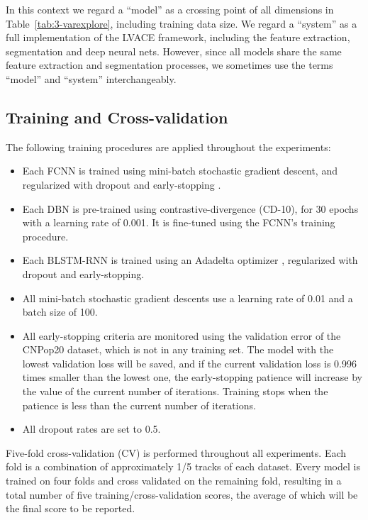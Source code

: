 In this context we regard a ``model'' as a crossing point of all dimensions in Table~\ref{tab:3-varexplore}, including training data size. We regard a ``system'' as a full implementation of the LVACE framework, including the feature extraction, segmentation and deep neural nets. However, since all models share the same feature extraction and segmentation processes, we sometimes use the terms ``model'' and ``system'' interchangeably.


\subsection{Training and Cross-validation}\label{sec:3-traintest}

The following training procedures are applied throughout the experiments: 
\begin{itemize}
	\item Each FCNN is trained using mini-batch stochastic gradient descent, and regularized with dropout \cite{srivastava2014dropout} and early-stopping \cite{prechelt1998automatic}. 
	\item Each DBN is pre-trained using contrastive-divergence \cite{hinton2006fast} (CD-10), for 30 epochs with a learning rate of 0.001. It is fine-tuned using the FCNN's training procedure.
	\item Each BLSTM-RNN is trained using an Adadelta optimizer \cite{zeiler2012adadelta}, regularized with dropout and early-stopping. 
	\item All mini-batch stochastic gradient descents use a learning rate of 0.01 and a batch size of 100. 
	\item All early-stopping criteria are monitored using the validation error of the CNPop20 dataset, which is not in any training set. The model with the lowest validation loss will be saved, and if the current validation loss is 0.996 times smaller than the lowest one, the early-stopping patience will increase by the value of the current number of iterations. Training stops when the patience is less than the current number of iterations.
	\item All dropout rates are set to 0.5. 
\end{itemize}
Five-fold cross-validation (CV) is performed throughout all experiments. Each fold is a combination of approximately 1/5 tracks of each dataset. Every model is trained on four folds and cross validated on the remaining fold, resulting in a total number of five training/cross-validation scores, the average of which will be the final score to be reported.

